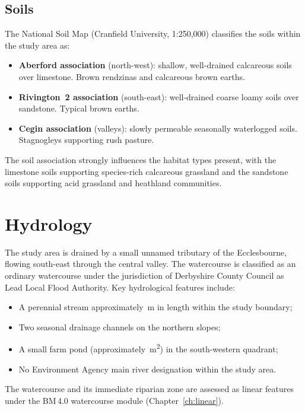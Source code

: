 \subsection{Soils}

The National Soil Map (Cranfield University, 1:250,000) classifies the soils within the study area as:
\begin{itemize}[nosep]
  \item \textbf{Aberford association} (north-west): shallow, well-drained calcareous soils over limestone. Brown rendzinas and calcareous brown earths.
  \item \textbf{Rivington~2 association} (south-east): well-drained coarse loamy soils over sandstone. Typical brown earths.
  \item \textbf{Cegin association} (valleys): slowly permeable seasonally waterlogged soils. Stagnogleys supporting rush pasture.
\end{itemize}

The soil association strongly influences the habitat types present, with the limestone soils supporting species-rich calcareous grassland and the sandstone soils supporting acid grassland and heathland communities.


\section{Hydrology}

The study area is drained by a small unnamed tributary of the Ecclesbourne, flowing south-east through the central valley. The watercourse is classified as an ordinary watercourse under the jurisdiction of Derbyshire County Council as Lead Local Flood Authority. Key hydrological features include:

\begin{itemize}[nosep]
  \item A perennial stream approximately \,m in length within the study boundary;
  \item Two seasonal drainage channels on the northern slopes;
  \item A small farm pond (approximately \,m\textsuperscript{2}) in the south-western quadrant;
  \item No Environment Agency main river designation within the study area.
\end{itemize}

The watercourse and its immediate riparian zone are assessed as linear features under the BM\,4.0 watercourse module (Chapter~\ref{ch:linear}).

